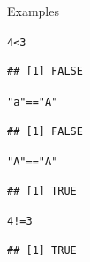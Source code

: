 \documentclass{beamer}\usepackage[]{graphicx}\usepackage[]{color}
\makeatletter
\newcommand{\hlnum}[1]{\textcolor[rgb]{0.686,0.059,0.569}{#1}}%
\newcommand{\hlstr}[1]{\textcolor[rgb]{0.192,0.494,0.8}{#1}}%
\newcommand{\hlopt}[1]{\textcolor[rgb]{0,0,0}{#1}}%
\newenvironment{kframe}{%
 \def\at@end@of@kframe{}%
 \ifinner\ifhmode%
  \def\at@end@of@kframe{\end{minipage}}%
  \begin{minipage}{\columnwidth}%
 \fi\fi%
 \def\FrameCommand##1{\hskip\@totalleftmargin \hskip-\fboxsep
 \colorbox{shadecolor}{##1}\hskip-\fboxsep
     \hskip-\linewidth \hskip-\@totalleftmargin \hskip\columnwidth}%
 \MakeFramed {\advance\hsize-\width
   \@totalleftmargin\z@ \linewidth\hsize
   \@setminipage}}%
 {\par\unskip\endMakeFramed%
 \at@end@of@kframe}
\newenvironment{knitrout}{}{} %
\renewenvironment{knitrout}{\begin{singlespace}}{\end{singlespace}}
\theoremstyle{mystyle}
\makeatother
\begin{document}
\begin{frame}[fragile]{Examples}
\begin{knitrout}
\color{fgcolor}\begin{kframe}
\begin{alltt}
\hlnum{4} \hlopt{<} \hlnum{3}
\end{alltt}
\begin{verbatim}
## [1] FALSE
\end{verbatim}
\begin{alltt}
\hlstr{"a"}\hlopt{==}\hlstr{"A"}
\end{alltt}
\begin{verbatim}
## [1] FALSE
\end{verbatim}
\begin{alltt}
\hlstr{"A"}\hlopt{==}\hlstr{"A"}
\end{alltt}
\begin{verbatim}
## [1] TRUE
\end{verbatim}
\begin{alltt}
\hlnum{4}\hlopt{!=}\hlnum{3}
\end{alltt}
\begin{verbatim}
## [1] TRUE
\end{verbatim}
\end{kframe}
\end{knitrout}
\end{frame}
\end{document}
